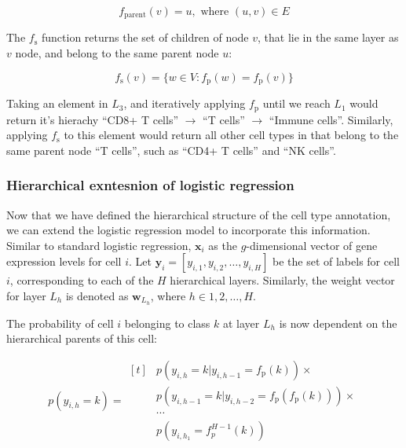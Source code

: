 \begin{equation}
    f_{\text{parent}}(v) = u, \text{ where } (u, v) \in E
\end{equation}

The $f_{\text{s}}$ function returns the set of children of node $v$, that lie in the same layer as $v$ node, and belong to the same parent node $u$:

\begin{equation}
    f_{\text{s}}(v) = \{w \in V : f_{\text{p}}(w) = f_{\text{p}}(v)\}
\end{equation}

Taking an element in $L_3$, and iteratively applying $f_{\text{p}}$ until we reach $L_1$  would return it's hierachy ``CD8+ T cells'' $\rightarrow$ ``T cells'' $\rightarrow$ ``Immune cells''. Similarly, applying $f_{\text{s}}$ to this element would return all other cell types in that belong to the same parent node ``T cells'', such as ``CD4+ T cells'' and ``NK cells''.

\subsubsection*{Hierarchical exntesnion of logistic regression}

Now that we have defined the hierarchical structure of the cell type annotation, we can extend the logistic regression model to incorporate this information. Similar to standard logistic regression, $\mathbf{x}_i$ as the $g$-dimensional vector of gene expression levels for cell $i$. Let $\mathbf{y}_i = [y_{i,1}, y_{i,2}, \ldots, y_{i,H}]$ be the set of labels for cell $i$, corresponding to each of the $H$ hierarchical layers. Similarly, the weight vector for layer $L_h$ is denoted as $\mathbf{w}_{L_h}$, where $h \in {1, 2, \ldots, H}$.

The probability of cell $i$ belonging to class $k$ at layer $L_h$ is now dependent on the hierarchical parents of this cell:

\begin{equation}
    p(y_{i,h} = k) = \begin{aligned}[t]
        & p(y_{i,h} = k | y_{i,h-1} = f_{\text{p}}(k)) \times \\
        & p(y_{i,h-1} = k | y_{i,h-2} = f_{\text{p}}(f_{\text{p}}(k))) \times \\
        & \cdots \\
        & p(y_{i,h_1} = f_{p}^{H-1}(k))
    \end{aligned}
\end{equation}

